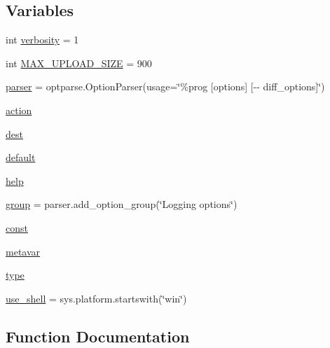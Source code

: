 \subsection*{Variables}
\begin{DoxyCompactItemize}
\item 
int \hyperlink{namespaceupload_a79aff46409a98c4e5f608c8df1fd4612}{verbosity} = 1
\item 
int \hyperlink{namespaceupload_aad5b1a43823e2a710a2f78e33dde8901}{M\+A\+X\+\_\+\+U\+P\+L\+O\+A\+D\+\_\+\+S\+I\+ZE} = 900
\item 
\hyperlink{namespaceupload_af9e508d19dc2dd9cdb7c642dde0bdd21}{parser} = optparse.\+Option\+Parser(usage=\char`\"{}\%prog \mbox{[}options\mbox{]} \mbox{[}-\/-\/ diff\+\_\+options\mbox{]}\char`\"{})
\item 
\hyperlink{namespaceupload_a675d13c979f1c720866d22ed1736f580}{action}
\item 
\hyperlink{namespaceupload_a770d9c7b49b1fede80de6078d5e49af7}{dest}
\item 
\hyperlink{namespaceupload_af4be925d9a50d5ad134d86400509d0f2}{default}
\item 
\hyperlink{namespaceupload_abfc23c9aa2d9b777678da117a85929a5}{help}
\item 
\hyperlink{namespaceupload_a9d33d66de17175dced88ffe95f079226}{group} = parser.\+add\+\_\+option\+\_\+group(\char`\"{}Logging options\char`\"{})
\item 
\hyperlink{namespaceupload_a985aa9a71de3eb507344df65700c696d}{const}
\item 
\hyperlink{namespaceupload_af1cea8af5389f0ab2d8b65b2c0fd2fe0}{metavar}
\item 
\hyperlink{namespaceupload_a4fc56f0dd6613be15c3c4dc3af3619ce}{type}
\item 
\hyperlink{namespaceupload_afa85ceef00a65cd276a856404eb5f310}{use\+\_\+shell} = sys.\+platform.\+startswith(\char`\"{}win\char`\"{})
\end{DoxyCompactItemize}


\subsection{Function Documentation}
